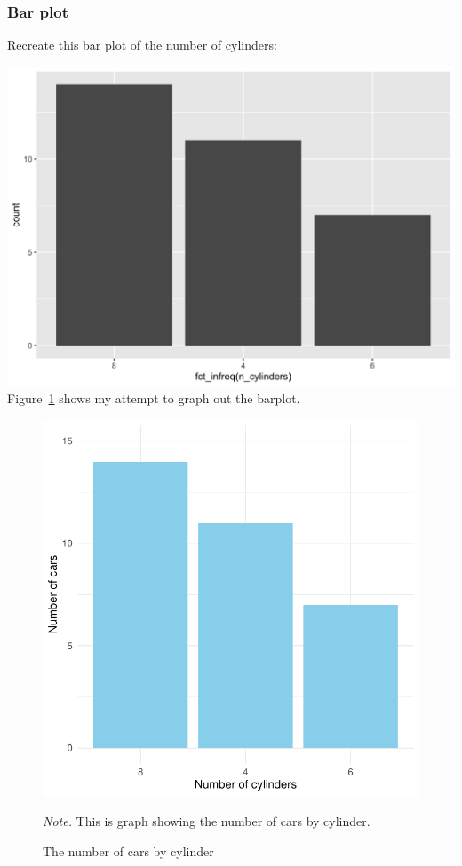 \documentclass[
  man,
  floatsintext,
  longtable,
  nolmodern,
  notxfonts,
  notimes,
  colorlinks=true,linkcolor=blue,citecolor=blue,urlcolor=blue]{apa7}
\begin{document}
\subsubsection{Bar plot}\label{bar-plot}

Recreate this bar plot of the number of cylinders:

\includegraphics{plots/plot2.png} Figure~\ref{fig-plot2-barplot} shows
my attempt to graph out the barplot.

\begin{figure}[!htbp]

{\caption{{The number of cars by cylinder}{\label{fig-plot2-barplot}}}}

\includegraphics{data-visualization_files/figure-pdf/fig-plot2-barplot-1.pdf}

{\noindent \emph{Note.} This is graph showing the number of cars by
cylinder.}

\end{figure}
\end{document}
